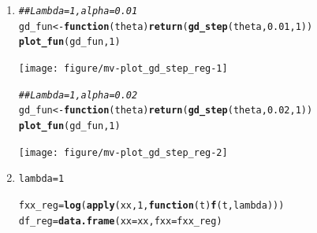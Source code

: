 \documentclass[a4paper]{article}
\makeatletter
\newcommand{\hlnum}[1]{\textcolor[rgb]{0.686,0.059,0.569}{#1}}%
\newcommand{\hlcom}[1]{\textcolor[rgb]{0.678,0.584,0.686}{\textit{#1}}}%
\newcommand{\hlstd}[1]{\textcolor[rgb]{0.345,0.345,0.345}{#1}}%
\newcommand{\hlkwa}[1]{\textcolor[rgb]{0.161,0.373,0.58}{\textbf{#1}}}%
\newcommand{\hlkwb}[1]{\textcolor[rgb]{0.69,0.353,0.396}{#1}}%
\newcommand{\hlkwc}[1]{\textcolor[rgb]{0.333,0.667,0.333}{#1}}%
\newcommand{\hlkwd}[1]{\textcolor[rgb]{0.737,0.353,0.396}{\textbf{#1}}}%
\newenvironment{kframe}{%
 \def\at@end@of@kframe{}%
 \ifinner\ifhmode%
  \def\at@end@of@kframe{\end{minipage}}%
  \begin{minipage}{\columnwidth}%
 \fi\fi%
 \def\FrameCommand##1{\hskip\@totalleftmargin \hskip-\fboxsep
 \colorbox{shadecolor}{##1}\hskip-\fboxsep
     \hskip-\linewidth \hskip-\@totalleftmargin \hskip\columnwidth}%
 \MakeFramed {\advance\hsize-\width
   \@totalleftmargin\z@ \linewidth\hsize
   \@setminipage}}%
 {\par\unskip\endMakeFramed%
 \at@end@of@kframe}
\newenvironment{knitrout}{}{} %
\makeatother
\begin{document}
{\begin{enumerate}
Gradient descent will in theory not converge since $\mathcal{R}_\text{emp}$ has no minimum (a)
\item

\begin{knitrout}
\color{fgcolor}\begin{kframe}
\begin{alltt}
\hlcom{## Lambda = 1, alpha = 0.01}
\hlstd{gd_fun} \hlkwb{<-} \hlkwa{function}\hlstd{(}\hlkwc{theta}\hlstd{)} \hlkwd{return}\hlstd{(}\hlkwd{gd_step}\hlstd{(theta,} \hlnum{0.01}\hlstd{,} \hlnum{1}\hlstd{))}
\hlkwd{plot_fun}\hlstd{(gd_fun,} \hlnum{1}\hlstd{)}
\end{alltt}
\end{kframe}
\texttt{[image: figure/mv-plot\_gd\_step\_reg-1]} 
\begin{kframe}\begin{alltt}
\hlcom{## Lambda = 1, alpha = 0.02}
\hlstd{gd_fun} \hlkwb{<-} \hlkwa{function}\hlstd{(}\hlkwc{theta}\hlstd{)} \hlkwd{return}\hlstd{(}\hlkwd{gd_step}\hlstd{(theta,} \hlnum{0.02}\hlstd{,} \hlnum{1}\hlstd{))}
\hlkwd{plot_fun}\hlstd{(gd_fun,} \hlnum{1}\hlstd{)}
\end{alltt}
\end{kframe}
\texttt{[image: figure/mv-plot\_gd\_step\_reg-2]} 
\end{knitrout}

\item 
\begin{knitrout}
\color{fgcolor}\begin{kframe}
\begin{alltt}
\hlstd{lambda} \hlkwb{=} \hlnum{1}

\hlstd{fxx_reg} \hlkwb{=} \hlkwd{log}\hlstd{(}\hlkwd{apply}\hlstd{(xx,} \hlnum{1}\hlstd{,} \hlkwa{function}\hlstd{(}\hlkwc{t}\hlstd{)} \hlkwd{f}\hlstd{(t, lambda)))}
\hlstd{df_reg} \hlkwb{=} \hlkwd{data.frame}\hlstd{(}\hlkwc{xx} \hlstd{= xx,} \hlkwc{fxx} \hlstd{= fxx_reg)}


\end{alltt}
\end{kframe}
\end{knitrout}
\end{enumerate}}
\end{document}
